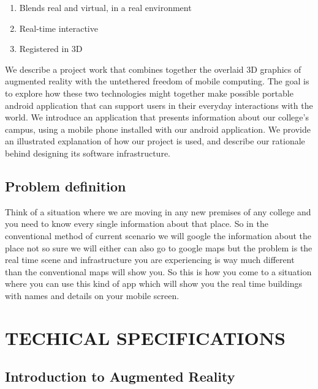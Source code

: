 \documentclass{article}
\begin{document}
\begin{enumerate}
\item  Blends real and virtual, in a real environment 
\item  Real-time interactive 
\item  Registered in 3D 
\end{enumerate}

\par We describe a project work that combines together the overlaid 3D graphics of augmented reality with the untethered freedom of mobile computing. The goal is to explore how these two technologies might together make possible portable android application that can support users in their everyday interactions with the world. We introduce an application that presents information about our college’s campus, using a mobile phone installed with our android application. We provide an illustrated explanation of how our project is used, and describe our rationale behind designing its software infrastructure. \\


\subsection{Problem definition}
\par Think of a situation where we are moving in any new premises of any college and you need to know every single information about that place. So in the conventional method of current scenario we will google the information about the place not so sure we will either can also go to google maps but the problem is the real time scene and infrastructure you are experiencing is way much different than the conventional maps will show you. So this is how you come to a situation where you can use this kind of app which will show you the real time buildings with names and details on your mobile screen.



\newpage
\section{TECHICAL SPECIFICATIONS}

\subsection{Introduction to Augmented Reality }
\end{document}
